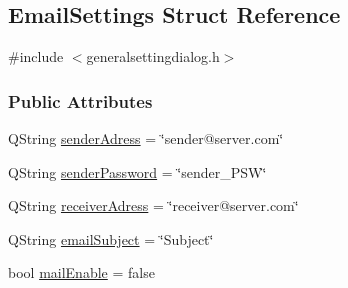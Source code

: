 \hypertarget{structEmailSettings}{}\subsection{Email\+Settings Struct Reference}
\label{structEmailSettings}

{\ttfamily \#include $<$generalsettingdialog.\+h$>$}

\subsubsection*{Public Attributes}
\begin{DoxyCompactItemize}
\item 
Q\+String \mbox{\hyperlink{structEmailSettings_a4822e2b6d8b205ee6da166d0e59401bb}{sender\+Adress}} = \char`\"{}sender@server.\+com\char`\"{}
\item 
Q\+String \mbox{\hyperlink{structEmailSettings_a7b1aeb6be785ede7976f820e44826441}{sender\+Password}} = \char`\"{}sender\+\_\+\+P\+SW\char`\"{}
\item 
Q\+String \mbox{\hyperlink{structEmailSettings_ab9270460446fa9329d7408b7c4755c85}{receiver\+Adress}} = \char`\"{}receiver@server.\+com\char`\"{}
\item 
Q\+String \mbox{\hyperlink{structEmailSettings_a99652b4dac6fae84c217cc4b7f88bc0e}{email\+Subject}} = \char`\"{}Subject\char`\"{}
\item 
bool \mbox{\hyperlink{structEmailSettings_abaf7163e9419cd940d67ad54a588cbb0}{mail\+Enable}} = false
\end{DoxyCompactItemize}


